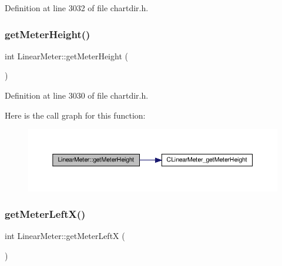 Definition at line 3032 of file chartdir.\+h.

\mbox{\label{class_linear_meter_a0512eb92ecebcc8fa768ae61b9f2bd89}} 
\subsubsection{\texorpdfstring{get\+Meter\+Height()}{getMeterHeight()}}
{\footnotesize\ttfamily int Linear\+Meter\+::get\+Meter\+Height (\begin{DoxyParamCaption}{ }\end{DoxyParamCaption})\hspace{0.3cm}{\ttfamily [inline]}}



Definition at line 3030 of file chartdir.\+h.

Here is the call graph for this function\+:
\nopagebreak
\begin{figure}[H]
\begin{center}
\leavevmode
\includegraphics[width=350pt]{class_linear_meter_a0512eb92ecebcc8fa768ae61b9f2bd89_cgraph}
\end{center}
\end{figure}
\mbox{\label{class_linear_meter_ab75f2dce6013211e5a241a13205263ef}} 
\subsubsection{\texorpdfstring{get\+Meter\+Left\+X()}{getMeterLeftX()}}
{\footnotesize\ttfamily int Linear\+Meter\+::get\+Meter\+LeftX (\begin{DoxyParamCaption}{ }\end{DoxyParamCaption})\hspace{0.3cm}{\ttfamily [inline]}}



